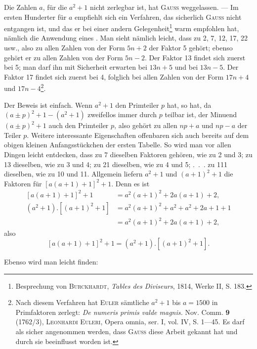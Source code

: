 \noindent\hspace*{\parindent}Die Zahlen $a$, für die $a^2+1$ nicht zerlegbar ist, hat \textsc{Gauss} weggelassen.
— Im ersten Hunderter für $a$ empfiehlt sich ein Verfahren, das sicherlich
\textsc{Gauss} nicht entgangen ist, und das er bei einer andern Gelegenheit\footnote{Besprechung von \textsc{Burckhardt}, \textit{Tables des Diviseurs}, 1814, Werke II, S. 183.} warm
empfohlen hat, nämlich die Anwendung eines . Man sieht
nämlich leicht, dass zu 2, 7, 12, 17, 22 usw., also zu allen Zahlen von der
Form $5n+2$ der Faktor 5 gehört; ebenso gehört er zu allen Zahlen von der
Form $5n-2$. Der Faktor 13 findet sich zuerst bei 5; man darf ihn mit
Sicherheit erwarten bei $13n+5$ und bei $13n-5$. Der Faktor 17 findet sich
zuerst bei 4, folglich bei allen Zahlen von der Form $17n+4$ und $17n-4$\footnote{Nach diesem Verfahren hat \textsc{Euler} sämtliche $a^2+1$ bis $a=1500$ in Primfaktoren zerlegt: \textit{De numeris primis valde magnis.} Nov. Comm. \textbf{9} (1762/3), \textsc{Leonhardi Euleri}, Opera omnia, ser. I, vol. IV, S. 1—45. Es darf als sicher angenommen werden, dass \textsc{Gauss} diese Arbeit gekannt hat und durch sie beeinflusst worden ist.}.

Der Beweis ist einfach. Wenn $a^2+1$ den Primteiler $p$ hat, so hat, da
$(a\pm p)^2+1-(a^2+1)$ zweifellos immer durch $p$ teilbar ist, der Minuend
$(a\pm p)^2+1$ auch den Primteiler $p$, also gehört zu allen $np+a$ und $np-a$
der Teiler $p$. Weitere interessante Eigenschaften offenbaren sich auch bereits
auf dem obigen kleinen Anfangsstückchen der ersten Tabelle.
\clearpage{}
\noindent\hspace*{\parindent}So wird man vor allen Dingen leicht entdecken, dass zu 7 dieselben Faktoren gehören, wie zu 2 und 3; zu 13 dieselben, wie zu 3 und 4; zu 21
dieselben, wie zu 4 und 5; \mbox{.\ .\ .} zu 111 dieselben, wie zu 10 und 11. Allgemein liefern $a^2+1$ und $(a+1)^2+1$ die Faktoren für $[a(a+1)+1]^2+1$.
Denn es ist
\[
\begin{aligned}
[a(a+1)+1]^2+1&=a^2(a+1)^2+2a(a+1)+2,\\
(a^2+1)\mathord{.}[(a+1)^2+1]&=a^2(a+1)^2+a^2+a^2+2a+1+1\\
&=a^2(a+1)^2+2a(a+1)+2,
\end{aligned}
\]
\noindent also
\[
[a(a+1)+1]^2+1=(a^2+1)\mathord{.}[(a+1)^2+1].
\]

Ebenso wird man leicht finden:

